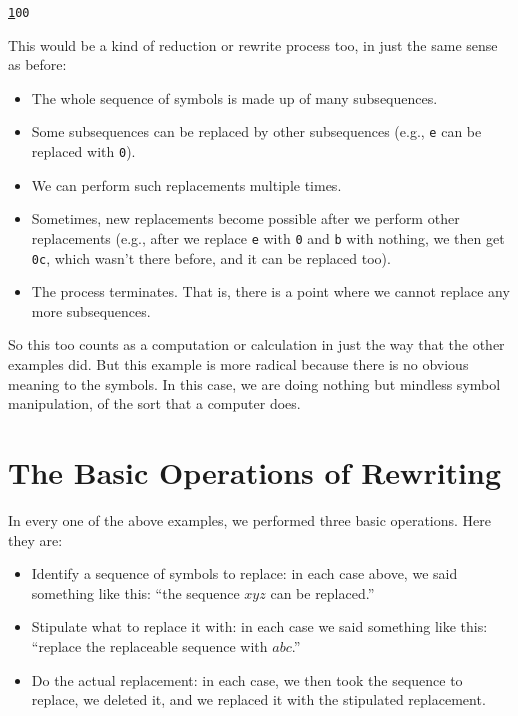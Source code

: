 \documentclass{book}
\numberwithin{equation}{chapter}
\begin{document}
\begin{center}
\texttt{\underline{1}00}
\end{center}

\noindent
This would be a kind of reduction or rewrite process too, in just the same sense as before:

\begin{itemize}
\item{The whole sequence of symbols is made up of many subsequences.}
    \item{Some subsequences can be replaced by other subsequences (e.g., \texttt{e} can be replaced with \texttt{0}).}
\item{We can perform such replacements multiple times.}
\item{Sometimes, new replacements become possible after we perform other replacements (e.g., after we replace \texttt{e} with \texttt{0} and \texttt{b} with nothing, we then get \texttt{0c}, which wasn't there before, and it can be replaced too).}
\item{The process terminates. That is, there is a point where we cannot replace any more subsequences.}
\end{itemize}

\noindent
So this too counts as a computation or calculation in just the way that the other examples did. But this example is more radical because there is no obvious meaning to the symbols. In this case, we are doing nothing but mindless symbol manipulation, of the sort that a computer does.


\section{The Basic Operations of Rewriting}

In every one of the above examples, we performed three basic operations. Here they are:

\begin{itemize}
\item{Identify a sequence of symbols to replace: in each case above, we said something like this: ``the sequence $xyz$ can be replaced.''}
\item{Stipulate what to replace it with: in each case we said something like this: ``replace the replaceable sequence with $abc$.''}
\item{Do the actual replacement: in each case, we then took the sequence to replace, we deleted it, and we replaced it with the stipulated replacement.}
\end{itemize}
\end{document}

